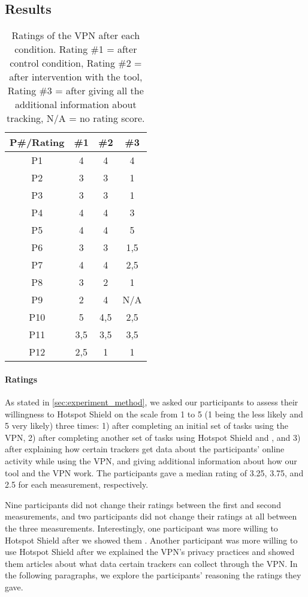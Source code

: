 \subsection{Results}\label{sec:results}

\begin{table}[h!]
\centering
\begin{tabular}{|c c c c|} 
 \hline
P\#/Rating & \#1 & \#2 & \#3 \\
\hline
P1 & 4 & 4 & 4\\
P2 & 3 & 3 & 1\\
P3 & 3 & 3 & 1\\
P4 & 4 & 4 & 3\\
P5 & 4 & 4 & 5\\
P6 & 3 & 3 & 1,5\\
P7 & 4 & 4 & 2,5\\
P8 & 3 & 2 & 1\\
P9 & 2 & 4 & N/A\\
P10 & 5 & 4,5 & 2,5\\
P11 & 3,5 & 3,5 & 3,5\\
P12 & 2,5 & 1 & 1 \\
 \hline
\end{tabular}
\caption{Ratings of the VPN after each condition. Rating \#1 = after control condition, Rating \#2 = after intervention with the tool, Rating \#3 = after giving all the additional information about tracking, N/A = no rating score.}
\label{table:2}
\end{table}

\paragraph{Ratings}

As stated in \ref{sec:experiment_method}, we asked our participants to assess their
willingness to Hotspot Shield on the scale from 1 to 5 (1 being the less likely
and 5 very likely) three times: 1) after completing an initial set of tasks using the
VPN, 2) after completing another set of tasks using Hotspot Shield and \tool, and
3) after explaining how certain trackers get data about the participants' online activity while using the VPN, and giving additional information about how our tool and the VPN work. The participants gave a median rating of 3.25, 3.75, and 2.5 for each measurement, respectively.

Nine participants did not change their ratings between the first and second measurements, and two participants did not change their ratings at
all between the three measurements. Interestingly, one participant was more willing to Hotspot Shield after we showed them \tool. Another participant was more willing to
use Hotspot Shield after we explained the VPN's privacy practices and showed them articles about what data certain trackers can collect through the VPN. In the following paragraphs, we explore the participants' reasoning the ratings they gave.

